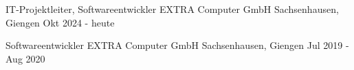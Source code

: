 
\begin{cventries}
  \cventry
  {IT-Projektleiter, Softwareentwickler} %
  {EXTRA Computer GmbH} %
  {Sachsenhausen, Giengen} %
  {Okt 2024 - heute} %
  {
  }

  \cventry
  {Softwareentwickler} %
  {EXTRA Computer GmbH} %
  {Sachsenhausen, Giengen} %
  {Jul 2019 - Aug 2020} %
  {
  }


\end{cventries}
